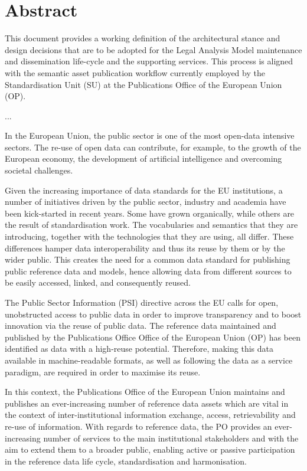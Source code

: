 \section*{Abstract}


    This document provides a working definition of the architectural stance and design decisions that are to be adopted for the Legal Analysis Model maintenance and dissemination life-cycle and the supporting services. This process is aligned with the semantic asset publication workflow currently employed by the Standardisation Unit (SU) at the Publications Office of the European Union (OP).
    
    ...
    
    In the European Union, the public sector is one of the most open-data intensive sectors. The re-use of open data can contribute, for example, to the growth of the European economy, the development of artificial intelligence and overcoming societal challenges.

	Given the increasing importance of data standards for the EU institutions, a number of initiatives driven by the public sector, industry and academia have been kick-started in recent years. Some have grown organically, while others are the result of standardisation work. The vocabularies and semantics that they are introducing, together with the technologies that they are using, all differ. These differences hamper data interoperability and thus its reuse by them or by the wider public. This creates the need for a common data standard for publishing public reference data and models, hence allowing data from different sources to be easily accessed, linked, and consequently reused.
	
	The Public Sector Information (PSI) directive across the EU calls for open, unobstructed access to public data in order to improve transparency and to boost innovation via the reuse of public data. The reference data maintained and published by the Publications Office Office of the European Union (OP) has been identified as data with a high-reuse potential. Therefore, making this data available in machine-readable formats, as well as following the data as a service paradigm, are required in order to maximise its reuse.
	
	In this context, the Publications Office of the European Union maintains and publishes an ever-increasing number of reference data assets which are vital in the context of inter-institutional information exchange, access, retrievability and re-use of information. With regards to reference data, the PO provides an ever-increasing number of services to the main institutional stakeholders and with the aim to extend them to a broader public, enabling active or passive participation in the reference data life cycle, standardisation and harmonisation.
	
